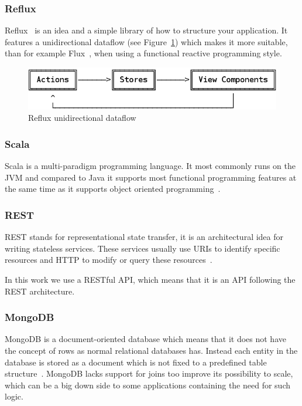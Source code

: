 \documentclass[a4paper,12pt]{article}
\begin{document}
\subsubsection{Reflux}
Reflux~\cite{REFLUX} is an idea and a simple library of how to structure your application. It features a unidirectional
dataflow (see Figure~\ref{fig:reflux}) which makes it more suitable, than for example Flux~\cite{FLUX}, when using a 
functional reactive programming style.

\begin{figure}[htp] 
    \centering
    \includegraphics[scale=0.4]{reflux.png}
    \caption{Reflux unidirectional dataflow}
    \label{fig:reflux}
\end{figure}

\subsubsection{Scala} 
Scala is a multi-paradigm programming language. It most commonly runs on the JVM and compared 
to Java it supports most functional programming features at the same time as it supports object oriented 
programming~\cite{SCALA}.  

\subsubsection{REST} REST stands for representational state transfer, it is an architectural 
idea for writing stateless services. These services usually use URIs to identify specific resources and HTTP to 
modify or query these resources~\cite{REST}. 

In this work we use a RESTful API, which means that it is an API following the REST architecture.  

\subsubsection{MongoDB}
MongoDB is a document-oriented database which means that it does not have the concept of rows as normal relational 
databases has. Instead each entity in the database is stored as a document which is not fixed to a predefined table 
structure~\cite{MONGODB}. MongoDB lacks support for joins too improve its possibility to scale, which can be a big 
down side to some applications containing the need for such logic.
\end{document}
